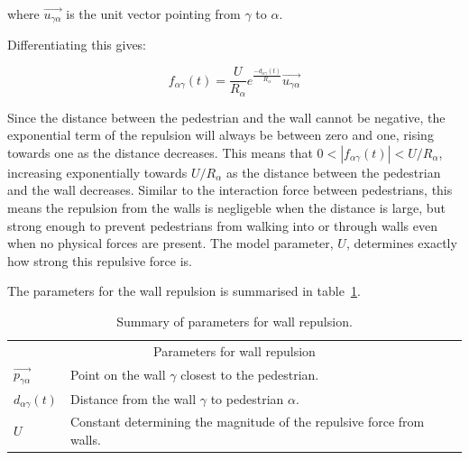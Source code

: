 where $\overrightarrow{u_{\gamma \alpha}}$ is the unit vector pointing from 
$\gamma$ to $\alpha$.

Differentiating this gives: 

\begin{equation}
    f_{\alpha \gamma}(t) =
    \frac{U}{R_\alpha} 
    e^{\frac{- d_{\alpha \gamma}(t) }{ R_{\alpha} }}
    \overrightarrow{u_{\gamma \alpha}}
    \label{eqn:wall-repulsion}
\end{equation}

Since the distance between the pedestrian and the wall cannot be negative, the 
exponential term of the repulsion will always be between zero and one, rising 
towards one as the distance decreases. This means that $0 < |f_{\alpha 
\gamma}(t)| < U/R_\alpha$, increasing exponentially towards $U/R_\alpha$ as 
the distance between the pedestrian and the wall decreases. Similar to the 
interaction force between pedestrians, this means the repulsion from the walls 
is negligeble when the distance is large, but strong enough to prevent 
pedestrians from walking into or through walls even when no physical forces 
are present. The model parameter, $U$, determines exactly how strong this 
repulsive force is.

The parameters for the wall repulsion is summarised in 
table~\ref{tbl:wall-repulsion}.

\begin{table}[h]
    \centering
    \begin{tabular}{l l}
        \toprule
        \multicolumn{2}{c}{\textsf{Parameters for wall repulsion}}\\
        $\overrightarrow{p_{\gamma \alpha}}$ & Point on the wall $\gamma$ closest to 
        the pedestrian.\\
        $d_{\alpha \gamma}(t)$ & Distance from the wall $\gamma$ to pedestrian 
        $\alpha$. \\
        $U$ & Constant determining the magnitude of the repulsive force from 
        walls. \\
        \bottomrule
    \end{tabular}
    \caption{Summary of parameters for wall repulsion.}
    \label{tbl:wall-repulsion}
\end{table}

